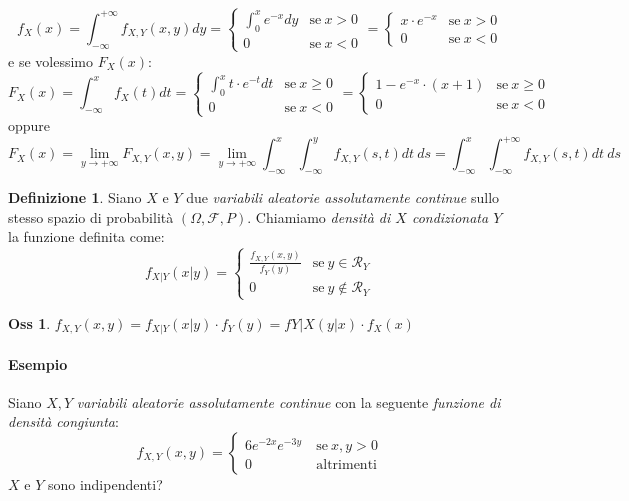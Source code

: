 \documentclass[12pt, a4paper]{report}
\theoremstyle{definition}
\newtheorem{definition}{Definizione}[section]
\newtheorem*{observation}{Oss}
\DeclareRobustCommand{\F}{\mathcal{F}}%
\DeclareRobustCommand{\supp}{\mathcal{R}}%
\DeclareRobustCommand{\probspace}{(\Omega,\F,P)}
\begin{document}
\[f_X(x)=\int_{-\infty}^{+\infty}f_{X,Y}(x,y)dy=\begin{cases}
	{\int_{0}^{x}e^{-x}dy} & \text{se}\ {x>0}\\
	{0} & \text{se}\ {x<0}
\end{cases}=\begin{cases}
	{x\cdot e^{-x}} & \text{se}\ {x>0}\\
	{0} & \text{se}\ {x<0}
\end{cases}\]
e se volessimo $F_X(x)$:
\[F_X(x)=\int_{-\infty}^{x}f_X(t)dt=\begin{cases}
	{\int_{0}^{x}t\cdot e^{-t}dt} & \text{se}\ {x\geq 0}\\
	{0} & \text{se}\ {x<0}
\end{cases}=\begin{cases}
	{1-e^{-x}\cdot (x+1)} & \text{se}\ {x\geq 0}\\
	{0} & \text{se}\ {x<0}
\end{cases}\]
oppure
\[F_X(x)=\lim_{y\rightarrow +\infty}F_{X,Y}(x,y)=\lim_{y\rightarrow +\infty}\int
_{-\infty}^{x}\int_{-\infty}^{y}f_{X,Y}(s,t)dt\ ds=\int_{-\infty}^{x}\int_{-\infty}
^{+\infty}f_{X,Y}(s,t)dt\ ds\]

\begin{definition}
	Siano $X$ e $Y$ due \emph{variabili aleatorie assolutamente continue} sullo
	stesso spazio di probabilità $\probspace$. Chiamiamo \emph{densità di $X$
	condizionata $Y$} la funzione definita come:
	\[f_{X|Y}(x|y)=\begin{cases}
		{\frac{f_{X,Y}(x,y)}{f_Y(y)}} & \text{se}\ {y\in\supp_Y}\\
		{0} & \text{se}\ {y\notin\supp_Y}
	\end{cases}\]
\end{definition}
\begin{observation}
	\(f_{X,Y}(x,y)=f_{X|Y}(x|y)\cdot f_Y(y)=f{Y|X}(y|x)\cdot f_X(x)\)
\end{observation}

\paragraph*{Esempio}
Siano $X,Y$ \emph{variabili aleatorie assolutamente continue} con la seguente
\emph{funzione di densità congiunta}:
\[f_{X,Y}(x,y)=\begin{cases}
	{6e^{-2x}e^{-3y}}\ & \text{se}\ {x,y>0}\\
	{0} & \text{altrimenti}
\end{cases}\]
$X$ e $Y$ sono indipendenti?
\end{document}
